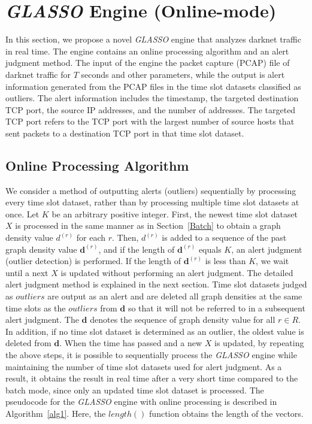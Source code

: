 \documentclass[conference]{IEEEtran}
\begin{document}
\section{\textit{GLASSO} Engine (Online-mode)}
\label{GLASSO}
In this section, we propose a novel \textit{GLASSO} engine that analyzes darknet traffic in real time.
The engine contains an online processing algorithm and an alert judgment method.
The input of the engine the packet capture (PCAP) file of darknet traffic for $T$ seconds and other parameters, while the output is alert information generated from the PCAP files in the time slot datasets classified as outliers.
The alert information includes the timestamp, the targeted destination TCP port, the source IP addresses, and the number of addresses.
The targeted TCP port refers to the TCP port with the largest number of source hosts that sent packets to a destination TCP port in that time slot dataset.


\subsection{Online Processing Algorithm}
We consider a method of outputting alerts (outliers) sequentially by processing every time slot dataset, rather than by processing multiple time slot datasets at once.
Let $K$ be an arbitrary positive integer.
First, the newest time slot dataset $X$ is processed in the same manner as in Section~\ref{Batch} to obtain a graph density value $d^{(r)}$ for each $r$.
Then, $d^{(r)}$ is added to a sequence of the past graph density value $\bm{d}^{(r)}$, and if the length of $\bm{d}^{(r)}$ equals $K$, an alert judgment (outlier detection) is performed.
If the length of $\bm{d}^{(r)}$ is less than $K$, we wait until a next $X$ is updated without performing an alert judgment.
The detailed alert judgment method is explained in the next section.
Time slot datasets judged as $outliers$ are output as an alert and are deleted all graph densities at the same time slots as the $outliers$ from $\bm{d}$ so that it will not be referred to in a subsequent alert judgment.
The $\bm{d}$ denotes the sequence of graph density value for all $r \in R$.
In addition, if no time slot dataset is determined as an outlier, the oldest value is deleted from $\bm{d}$.
When the time has passed and a new $X$ is updated, by repeating the above steps, it is possible to sequentially process the \textit{GLASSO} engine while maintaining the number of time slot datasets used for alert judgment.
As a result, it obtains the result in real time after a very short time compared to the batch mode, since only an updated time slot dataset is processed.
The pseudocode for the \textit{GLASSO} engine with online processing is described in Algorithm~\ref{alg1}.
Here, the $length()$ function obtains the length of the vectors.
\end{document}
